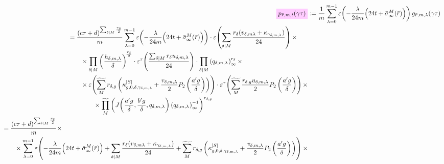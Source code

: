 \documentclass{article}
\begin{document}
\begin{align}
  \defineNotation[p-rbar-m-t-gamma-tau]{p_{\bar{r},m,t}(\gamma\tau)}
  &:=\frac{1}{m} \sum_{\lambda=0}^{m-1}
    \unityPower{-\frac{\lambda}{24m}\Bigl(24t+\sigmainftybar[M]{\bar{r}}\Bigr)}
    g_{\bar{r},m,\lambda}(\gamma\tau)
  \notag\\
  \begin{split}
  &=
    \frac{(c\tau+d)^{\divisorsum{M} \frac{r_\delta}{2}}}{m}
    \sum_{\lambda=0}^{m-1}
    \unityPower{-\frac{\lambda}{24m}\Bigl(24t+\sigmainftybar[M]{\bar{r}}\Bigr)}
    \cdot
    \unityPower{\divisorsum{M}\frac{r_\delta(v_{\delta,m\lambda}
                + \kappa_{\gamma_{\delta,m,\lambda}})}{24}}
  \times\\
  & \qquad\times
    \divisorprod{M}
    \left(\frac{h_{\delta,m,\lambda}}{\delta}\right)^{\!\frac{r_\delta}{2}}
    \cdot
    \unityPowerTau{\frac{\divisorsum{M} r_\delta u_{\delta,m,\lambda}}{24}}
    \cdot
    \divisorprod{M}
    \eulerFunction[q_{\delta,m,\lambda}]{}^{r_\delta}
  \times\\
  & \qquad\times
    \unityPower{
      \gensum[M]
      r_{\delta,g}
      \left(
      \kappa_{g,0,\delta,\gamma_{\delta,m,\lambda}}^{[S]}
      +
      \frac{v_{\delta,m,\lambda}}{2} P_2\left(\frac{a' g}{\delta}\right)
      \right)}
  \cdot
  \unityPowerTau{
    \gensum[M]
    \frac{r_{\delta,g} u_{\delta,m,\lambda}}{2} P_2\left(\frac{a' g}{\delta}\right)}
  \times
  \\
  &\qquad\qquad
  \times
  \genprod[M]
  \left(
    \jacobiAlpha{\frac{a' g}{\delta}}{\frac{b' g}{\delta}}{q_{\delta,m,\lambda}}
    \eulerFunction[q_{\delta,m,\lambda}]{}^{-1}
  \right)^{r_{\delta,g}}
  \end{split}
  \notag\\
  \begin{split}
  &=
    \frac{(c\tau+d)^{\divisorsum{M} \frac{r_\delta}{2}}}{m}
  \times\\
  & \qquad\times
  \sum_{\lambda=0}^{m-1}
    \unityPower{-\frac{\lambda}{24m}\Bigl(24t+\sigmainftybar[M]{\bar{r}}\Bigr)
      + \divisorsum{M}\frac{r_\delta(v_{\delta,m\lambda}
        + \kappa_{\gamma_{\delta,m,\lambda}})}{24}
      +
      \gensum[M]
      r_{\delta,g}
      \left(
        \kappa_{g,0,\delta,\gamma_{\delta,m,\lambda}}^{[S]}
        +
        \frac{v_{\delta,m,\lambda}}{2} P_2\left(\frac{a' g}{\delta}\right)
      \right)}
  \times\\

\end{split}
\end{align}
\end{document}
